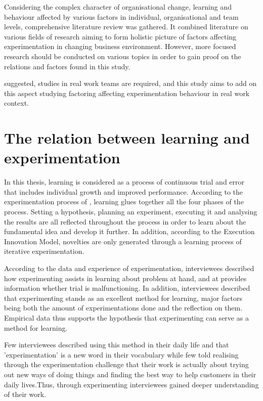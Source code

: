 Considering the complex character of organisational change, learning and behaviour affected by various factors in individual, organisational and team levels, comprehensive literature review was gathered. It combined literature on various fields of research aiming to form holistic picture of factors affecting experimentation in changing business environment. However, more focused research should be conducted on various topics in order to gain proof on the relations and factors found in this study. 

\citet{edmondson1999psychological} suggested, studies in real work teams are required, and this study aims to add on this aspect studying factoring affecting experimentation behaviour in real work context. 

\section{The relation between learning and experimentation} \label{relation}
In this thesis, learning is considered as a process of continuous trial and error \citep{argyris1978organizational,edmondson1999psychological} that includes individual growth and improved performance. According to the experimentation process of \citet{thomke1998managing}, learning glues together all the four phases of the process. Setting a hypothesis, planning an experiment, executing it and analysing the results are all reflected throughout the process in order to learn about the fundamental idea and develop it further. In addition, according to the Execution Innovation Model, novelties are only generated through a learning process of iterative experimentation. \citep{tuulenmaki2011art} 

According to the data and experience of experimentation, interviewees described how experimenting assists in learning about problem at hand, and at provides information whether trial is malfunctioning. In addition, interviewees described that experimenting stands as an excellent method for learning, major factors being both the amount of experimentations done and the reflection on them. Empirical data thus supports the hypothesis that experimenting can serve as a method for learning. 

Few interviewees described using this method in their daily life and that 'experimentation' is a new word in their vocabulary while few told realising through the experimentation challenge that their work is actually about trying out new ways of doing things and finding the best way to help customers in their daily lives.Thus, through experimenting interviewees gained deeper understanding of their work.


